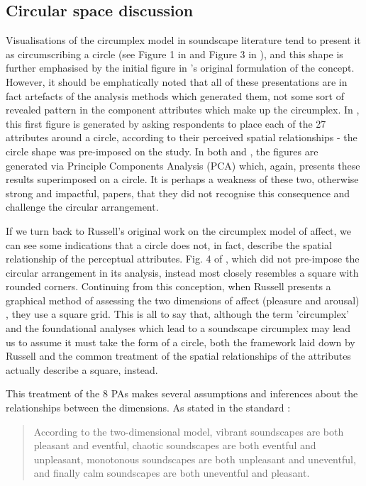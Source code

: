 \subsection{Circular space discussion}
Visualisations of the circumplex model in soundscape literature tend to present it as circumscribing a circle (see Figure 1 in \citep{Axelsson2010principal} and Figure 3 in \citep{Torresin2020Indoor}), and this shape is further emphasised by the initial figure in \citet{Russell1980circumplex}'s original formulation of the concept. However, it should be emphatically noted that all of these presentations are in fact artefacts of the analysis methods which generated them, not some sort of revealed pattern in the component attributes which make up the circumplex. In \citet{Russell1980circumplex}, this first figure is generated by asking respondents to place each of the 27 attributes around a circle, according to their perceived spatial relationships - the circle shape was pre-imposed on the study. In both \citet{Axelsson2010principal} and \citet{Torresin2020Indoor}, the figures are generated via Principle Components Analysis (PCA) which, again, presents these results superimposed on a circle. It is perhaps a weakness of these two, otherwise strong and impactful, papers, that they did not recognise this consequence and challenge the circular arrangement.

If we turn back to Russell's original work on the circumplex model of affect, we can see some indications that a circle does not, in fact, describe the spatial relationship of the perceptual attributes. Fig. 4 of \citep{Russell1980circumplex}, which did not pre-impose the circular arrangement in its analysis, instead most closely resembles a square with rounded corners. Continuing from this conception, when Russell presents a graphical method of assessing the two dimensions of affect (pleasure and arousal) \citep{Russell1989Affect}, they use a square grid. This is all to say that, although the term 'circumplex' and the foundational analyses which lead to a soundscape circumplex may lead us to assume it must take the form of a circle, both the framework laid down by Russell and the common treatment of the spatial relationships of the attributes actually describe a square, instead.

This treatment of the 8 PAs makes several assumptions and inferences about the relationships between the dimensions. As stated in the standard \citep[p. 5]{ISO12913Part3}:

\begin{quote}
  According to the two-dimensional model, vibrant soundscapes are both pleasant and eventful, chaotic soundscapes are both eventful and unpleasant, monotonous soundscapes are both unpleasant and uneventful, and finally calm soundscapes are both uneventful and pleasant.
\end{quote}

